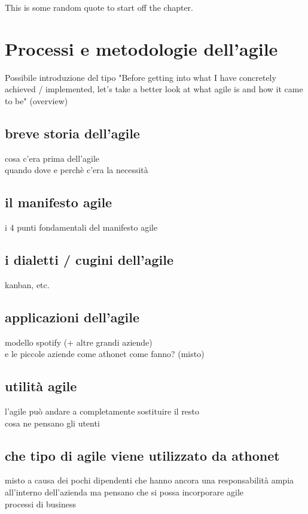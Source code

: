 \begin{savequote}[75mm]
This is some random quote to start off the chapter.
\end{savequote}

\chapter{Processi e metodologie dell'agile}


Possibile introduzione del tipo "Before getting into what I have concretely achieved / implemented, let's take a better look at what agile is and how it came to be" (overview)

\section{breve storia dell'agile}
cosa c'era prima dell'agile\\
quando dove e perchè c'era la necessità

\section{il manifesto agile}
i 4 punti fondamentali del manifesto agile

\section{i dialetti / cugini dell'agile}
kanban, etc.

\section{applicazioni dell'agile }
modello spotify (+ altre grandi aziende)\\
e le piccole aziende come athonet come fanno? (misto)

\section{utilità agile}
l'agile può andare a completamente sostituire il resto\\
cosa ne pensano gli utenti

\section{che tipo di agile viene utilizzato da athonet}
misto a causa dei pochi dipendenti che hanno ancora una responsabilità ampia all'interno dell'azienda ma pensano che si possa incorporare agile\\
processi di business


